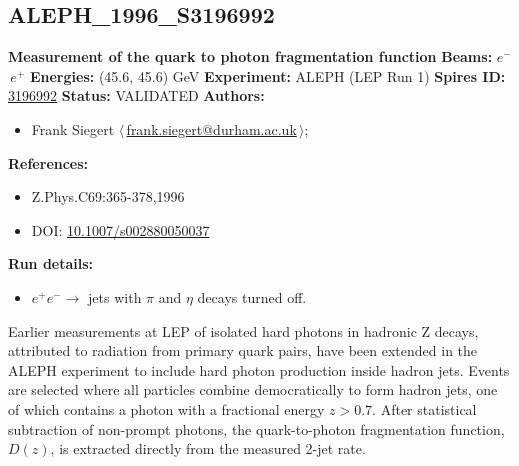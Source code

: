 \clearpage


\clearpage

\subsection[ALEPH\_1996\_S3196992]{ALEPH\_1996\_S3196992\,\cite{Buskulic:1995au}}
\textbf{Measurement of the quark to photon fragmentation function}\newline
\textbf{Beams:} $e^-$\,$e^+$ \newline
\textbf{Energies:} (45.6, 45.6) GeV \newline
\textbf{Experiment:} ALEPH (LEP Run 1) \newline
\textbf{Spires ID:} \href{http://www.slac.stanford.edu/spires/find/hep/www?rawcmd=key+3196992}{3196992}\newline
\textbf{Status:} VALIDATED\newline
\textbf{Authors:}
\begin{itemize}
  \item Frank Siegert $\langle\,$\href{mailto:frank.siegert@durham.ac.uk}{frank.siegert@durham.ac.uk}$\,\rangle$;
\end{itemize}
\textbf{References:}
\begin{itemize}
  \item Z.Phys.C69:365-378,1996
  \item DOI: \href{http://dx.doi.org/10.1007/s002880050037}{10.1007/s002880050037}
\end{itemize}
\textbf{Run details:}
\begin{itemize}

  \item $e^+e^-\to$ jets with $\pi$ and $\eta$ decays turned off.\end{itemize}

\noindent Earlier measurements at LEP of isolated hard photons in hadronic Z decays, attributed to radiation from primary quark pairs, have been extended in the ALEPH experiment to include hard photon production inside hadron jets. Events are selected where all particles combine democratically to form hadron jets, one of which contains a photon with a fractional energy $z > 0.7$. After statistical subtraction of non-prompt photons, the quark-to-photon fragmentation function, $D(z)$, is extracted directly from the measured 2-jet rate.

\clearpage


\clearpage

